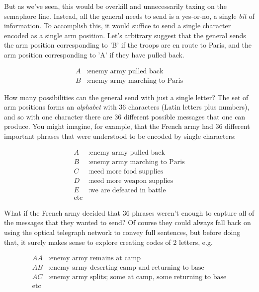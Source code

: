 \documentclass[UTF8]{book}
\begin{document}
\begin{CJK}{UTF8}{gbsn}
But as we've seen, this would be overkill and unnecessarily taxing on the semaphore line. Instead, all the general needs to send is a yes-or-no, a single \emph{bit} of information. To accomplish this, it would suffice to send a single character encoded as a single arm position. Let's arbitrary suggest that the general sends the arm position corresponding to 'B' if the troops are en route to Paris, and the arm position corresponding to 'A' if they have pulled back.

\begin{align*}
	A&: \text{enemy army pulled back} \\
	B&: \text{enemy army marching to Paris}
\end{align*}

How many possibilities can the general send with just a single letter? The set of arm positions forms an \emph{alphabet} with 36 characters (Latin letters plus numbers), and so with one character there are 36 different possible messages that one can produce. You might imagine, for example, that the French army had 36 different important phrases that were understood to be encoded by single characters:

\begin{align*}
	A&: \text{enemy army pulled back} \\
	B&: \text{enemy army marching to Paris} \\
	C&: \text{need more food supplies} \\
        D&: \text{need more weapon supplies} \\
        E&: \text{we are defeated in battle} \\
        \text{etc} &
\end{align*}

What if the French army decided that 36 phrases weren't enough to capture all of the messages that they wanted to send? Of course they could always fall back on using the optical telegraph network to convey full sentences, but before doing that, it surely makes sense to explore creating codes of 2 letters, e.g.

\begin{align*}
	AA&: \text{enemy army remains at camp} \\
	AB&: \text{enemy army deserting camp and returning to base} \\
	AC&: \text{enemy army splits; some at camp, some returning to base} \\
        \text{etc} &
\end{align*}


\end{CJK}
\end{document}

